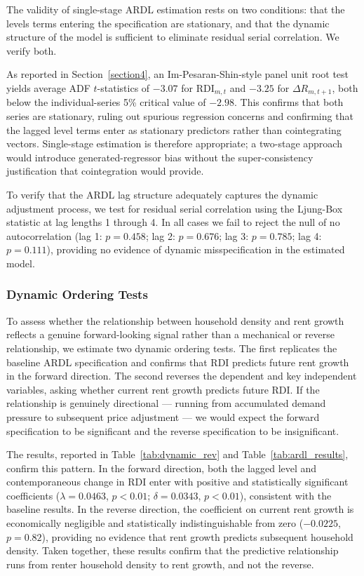 \documentclass[pdflatex,sn-apa]{sn-jnl}%
\theoremstyle{thmstyleone}%
\theoremstyle{thmstyletwo}%
\theoremstyle{thmstylethree}%
\begin{document}
The validity of single-stage ARDL estimation rests on two conditions: that the 
levels terms entering the specification are stationary, and that the dynamic 
structure of the model is sufficient to eliminate residual serial correlation. 
We verify both.

As reported in Section~\ref{section4}, an Im-Pesaran-Shin-style panel unit 
root test yields average ADF $t$-statistics of $-3.07$ for $\text{RDI}_{m,t}$ 
and $-3.25$ for $\Delta R_{m,t+1}$, both below the individual-series 5\% 
critical value of $-2.98$. This confirms that both series are stationary, 
ruling out spurious regression concerns and confirming that the lagged level 
terms enter as stationary predictors rather than cointegrating vectors. 
Single-stage estimation is therefore appropriate; a two-stage approach would 
introduce generated-regressor bias without the super-consistency justification 
that cointegration would provide.

To verify that the ARDL lag structure adequately captures the dynamic 
adjustment process, we test for residual serial correlation using the 
Ljung-Box statistic at lag lengths 1 through 4. In all cases we fail to reject 
the null of no autocorrelation (lag 1: $p = 0.458$; lag 2: $p = 0.676$; 
lag 3: $p = 0.785$; lag 4: $p = 0.111$), providing no evidence of dynamic 
misspecification in the estimated model.

\subsubsection{Dynamic Ordering Tests}

To assess whether the relationship between household density and rent growth 
reflects a genuine forward-looking signal rather than a mechanical or reverse 
relationship, we estimate two dynamic ordering tests. The first replicates the 
baseline ARDL specification and confirms that RDI predicts future rent growth 
in the forward direction. The second reverses the dependent and key independent 
variables, asking whether current rent growth predicts future RDI. If the 
relationship is genuinely directional --- running from accumulated demand 
pressure to subsequent price adjustment --- we would expect the forward 
specification to be significant and the reverse specification to be 
insignificant.

The results, reported in Table~\ref{tab:dynamic_rev} and Table~\ref{tab:ardl_results}, confirm this pattern. In the forward direction, both 
the lagged level and contemporaneous change in RDI enter with positive and 
statistically significant coefficients ($\lambda = 0.0463$, $p < 0.01$; 
$\delta = 0.0343$, $p < 0.01$), consistent with the baseline results. In the 
reverse direction, the coefficient on current rent growth is economically 
negligible and statistically indistinguishable from zero ($-0.0225$, $p = 
0.82$), providing no evidence that rent growth predicts subsequent household 
density. Taken together, these results confirm that the predictive relationship 
runs from renter household density to rent growth, and not the reverse.
\end{document}
